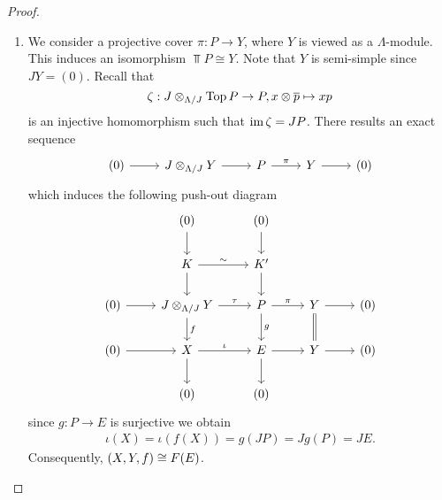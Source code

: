 \begin{proof}
\begin{enumerate}
 \item We consider a projective cover $\pi : P \to Y$, where $Y$ is viewed as a
 $\Lambda$-module. This induces an isomorphism $\Top P \cong Y$. Note that $Y$ is semi-simple since $J Y = (0)$. Recall that
\[ \zeta : J \otimes_{\Lambda/J} \operatorname{Top} P \to P, x \otimes
\overline p \mapsto xp\]
 is an injective homomorphism such that $\operatorname{im} \zeta = J P$. There results
 an exact sequence
\[\begin{tikzcd}
(0) \rar& J \otimes_{\factor \Lambda {J}} Y \rar& P \rar["\pi"]& Y \rar& (0)
\end{tikzcd}\]
 which induces the following push-out diagram
\[\begin{tikzcd}
 & (0)\dar & (0)\dar\\
 & K \dar\rar["\sim"]& K'\dar\\
(0) \rar& J \otimes_{\factor \Lambda {J}} Y \rar["\tau"]\dar["f"]& P \rar["\pi"]\dar["g"]& Y \rar\dar[equal]& (0)\\
(0) \rar& X \rar["\iota"]\dar& E \rar\dar& Y \rar& (0)\\
 & (0)& (0)
\end{tikzcd}\]
 since $g : P \to E$ is surjective we obtain
\begin{align*}
\iota(X) = \iota(f(X)) = g(J P) = J g(P) = J E.
\end{align*}
 Consequently, $(X, Y, f) \cong F(E)$.\qedhere
 \end{enumerate}
\end{proof}
